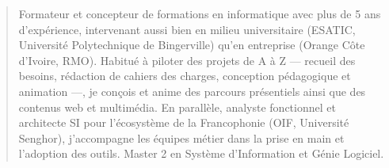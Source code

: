 \documentclass[10pt,a4paper,ragged2e,withhyper]{altacv}
\begin{document}


    \makecvheader

    \begin{quote}
    \normalsize Formateur et concepteur de formations en informatique avec plus de 5 ans d'expérience, intervenant aussi bien en milieu universitaire (ESATIC, Université Polytechnique de Bingerville) qu'en entreprise (Orange Côte d'Ivoire, RMO). Habitué à piloter des projets de A à Z — recueil des besoins, rédaction de cahiers des charges, conception pédagogique et animation —, je conçois et anime des parcours présentiels ainsi que des contenus web et multimédia. En parallèle, analyste fonctionnel et architecte SI pour l'écosystème de la Francophonie (OIF, Université Senghor), j'accompagne les équipes métier dans la prise en main et l'adoption des outils. Master 2 en Système d'Information et Génie Logiciel.
    \end{quote}
    \vspace{-0.5em}
\end{document}
